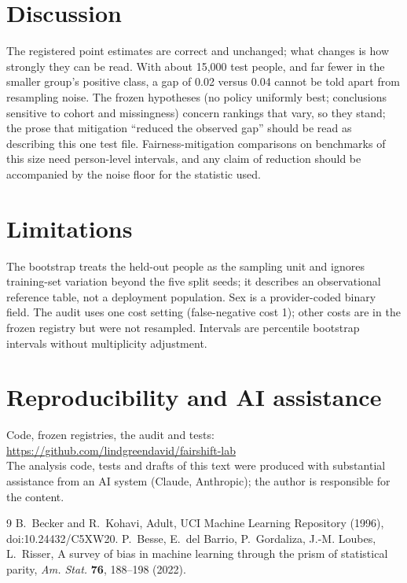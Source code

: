 \documentclass[11pt]{article}
\begin{document}
\section{Discussion}
The registered point estimates are correct and unchanged; what changes is how strongly they can be read. With about 15{,}000 test
people, and far fewer in the smaller group's positive class, a gap of 0.02 versus 0.04 cannot be told apart from
resampling noise. The frozen hypotheses (no policy uniformly best; conclusions sensitive to cohort and missingness) concern rankings that
vary, so they stand; the prose that mitigation ``reduced the observed gap'' should be read as describing this one test file.
Fairness-mitigation comparisons on benchmarks of this size need person-level intervals, and any claim of reduction should be accompanied
by the noise floor for the statistic used.

\section{Limitations}
The bootstrap treats the held-out people as the sampling unit and ignores training-set variation beyond the five split seeds; it describes
an observational reference table, not a deployment population. Sex is a provider-coded binary field. The audit uses one cost setting
(false-negative cost 1); other costs are in the frozen registry but were not resampled. Intervals are percentile bootstrap intervals
without multiplicity adjustment.

\section*{Reproducibility and AI assistance}
Code, frozen registries, the audit and tests:\\
\url{https://github.com/lindgreendavid/fairshift-lab}\\
The analysis code, tests and drafts of this text were produced with substantial assistance from an AI system (Claude, Anthropic);
the author is responsible for the content.

\begin{thebibliography}{9}
 B.~Becker and R.~Kohavi, Adult, UCI Machine Learning Repository (1996), doi:10.24432/C5XW20.
 P.~Besse, E.~del Barrio, P.~Gordaliza, J.-M. Loubes, L.~Risser, A survey of bias in machine learning through
the prism of statistical parity, \emph{Am. Stat.} \textbf{76}, 188--198 (2022).
\end{thebibliography}
\end{document}
